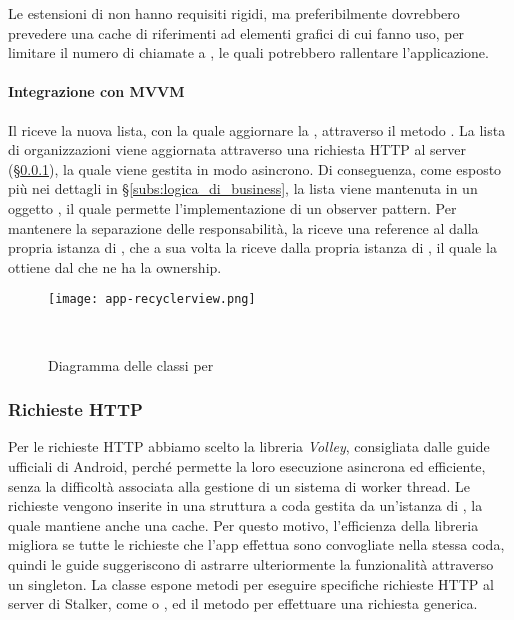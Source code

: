 \documentclass[../../manuale-manutentore.tex]{subfiles}
\begin{document}
Le estensioni di  non hanno requisiti rigidi, ma preferibilmente dovrebbero prevedere una cache di riferimenti ad elementi grafici di cui fanno uso, per limitare il numero di chiamate a , le quali potrebbero rallentare l'applicazione.

\paragraph{Integrazione con MVVM}%
\label{par:integrazione_con_mvvm}

Il  riceve la nuova lista, con la quale aggiornare la , attraverso il metodo .
La lista di organizzazioni viene aggiornata attraverso una richiesta HTTP al server (§\ref{subs:richieste_http}), la quale viene gestita in modo asincrono.
Di conseguenza, come esposto più nei dettagli in §\ref{subs:logica_di_business}, la lista viene mantenuta in un oggetto , il quale permette l'implementazione di un observer pattern.
Per mantenere la separazione delle responsabilità, la  riceve una reference al  dalla propria istanza di , che a sua volta la riceve dalla propria istanza di , il quale la ottiene dal  che ne ha la ownership.

\begin{figure}[h]
  \centering
  \texttt{[image: app-recyclerview.png]}
  \caption{Diagramma delle classi per }
~~\label{fig:app/diagramma_classi_recyclerview}
\end{figure}

\subsubsection{Richieste HTTP}%
\label{subs:richieste_http}
Per le richieste HTTP abbiamo scelto la libreria \textit{Volley}, consigliata dalle guide ufficiali di Android, perché permette la loro esecuzione asincrona ed efficiente, senza la difficoltà associata alla gestione di un sistema di worker thread.
Le richieste vengono inserite in una struttura a coda gestita da un'istanza di , la quale mantiene anche una cache.
Per questo motivo, l'efficienza della libreria migliora se tutte le richieste che l'app effettua sono convogliate nella stessa coda, quindi le guide suggeriscono di astrarre ulteriormente la funzionalità attraverso un singleton.
La classe  espone metodi per eseguire specifiche richieste HTTP al server di Stalker, come  o , ed il metodo  per effettuare una richiesta generica.
\end{document}
